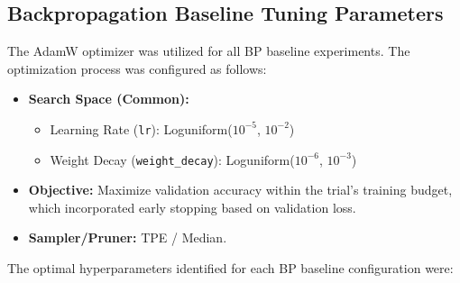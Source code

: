 \documentclass[11pt, english]{article}
\begin{document}
\subsection{Backpropagation Baseline Tuning Parameters}
The AdamW optimizer \cite{loshchilov2017decoupled} was utilized for all BP baseline experiments. The optimization process was configured as follows:
\begin{itemize}
    \item \textbf{Search Space (Common):}
        \begin{itemize}
            \item Learning Rate (\texttt{lr}): Loguniform($10^{-5}$, $10^{-2}$)
            \item Weight Decay (\texttt{weight\_decay}): Loguniform($10^{-6}$, $10^{-3}$)
        \end{itemize}
    \item \textbf{Objective:} Maximize validation accuracy within the trial's training budget, which incorporated early stopping based on validation loss.
    \item \textbf{Sampler/Pruner:} TPE / Median.
\end{itemize}
The optimal hyperparameters identified for each BP baseline configuration were:
\end{document}
